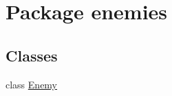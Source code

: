 \hypertarget{namespaceenemies}{}\section{Package enemies}
\label{namespaceenemies}
\subsection*{Classes}
\begin{DoxyCompactItemize}
\item 
class \hyperlink{classenemies_1_1_enemy}{Enemy}
\end{DoxyCompactItemize}
